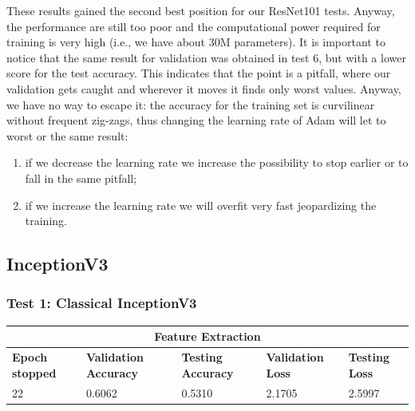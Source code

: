 These results gained the second best position for our ResNet101 tests. Anyway, the performance are still too poor and the computational power required for training is very high (i.e., we have about 30M parameters). It is important to notice that the same result for validation was obtained in test 6, but with a lower score for the test accuracy. This indicates that the point is a pitfall, where our validation gets caught and wherever it moves it finds only worst values.
Anyway, we have no way to escape it: the accuracy for the training set is curvilinear without frequent zig-zags, thus changing the learning rate of Adam will let to worst or the same result:
\begin{enumerate}
\item if we decrease the learning rate we increase the possibility to stop earlier or to fall in the same pitfall;
\item if we increase the learning rate we will overfit very fast jeopardizing the training.
\end{enumerate}


\subsection{InceptionV3}

\subsubsection{Test 1: Classical InceptionV3}


\begin{tabular}{ |p{2cm}|p{2cm}|p{2cm}|p{2cm}|p{2cm}|  }
\hline
\multicolumn{5}{|c|}{Feature Extraction} \\
\hline
\textbf{Epoch stopped} & \textbf{Validation Accuracy} & \textbf{Testing Accuracy} & \textbf{Validation Loss} & \textbf{Testing Loss} \\
\hline
22 & 0.6062 & 0.5310 & 2.1705 & 2.5997\\
\hline
\end{tabular}

